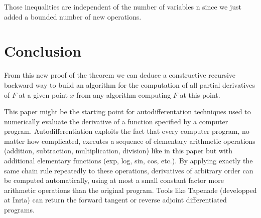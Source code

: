 \vskip 0.5cm

Those inequalities are independent of the number of variables n since we just added a bounded number of new operations.

\section{Conclusion}

From this new proof of the theorem we can deduce a constructive recursive backward way to build an algorithm for the computation of all partial derivatives of $F$ at a given point $x$ from any algorithm computing $F$ at this point.

\vskip 0.3cm
This paper might be the starting point for autodifferentation techniques used to numerically evaluate the derivative of a function specified by a computer program.
Autodifferentiation exploits the fact that every computer program,
no matter how complicated,
executes a sequence of elementary arithmetic operations 
(addition,
subtraction,
multiplication,
division)
like in this paper but with additional elementary functions 
(exp,
log,
sin,
cos,
etc.).
By applying exactly the same chain rule repeatedly to these operations,
derivatives of arbitrary order can be computed automatically,
using at most a small constant factor more arithmetic operations than the original program.
Tools like Tapenade (developped at Inria) can return the forward tangent or reverse adjoint differentiated programs. 









 
 
 
 
 
 
 
 
 
 
 
 
 
